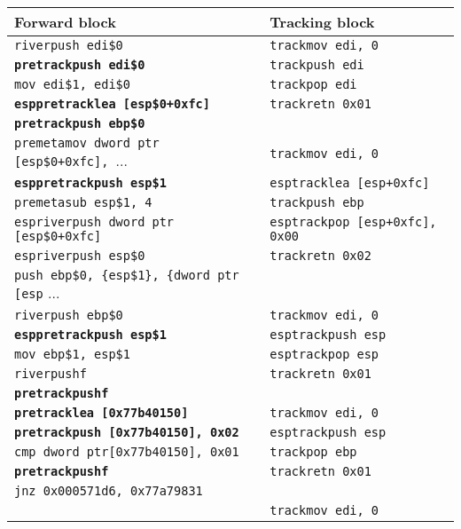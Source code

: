 \documentclass[12pt]{report}
\begin{document}
\begin{table}[H]
	\begin{tabular}{| p{9.7cm} | l |}
		\hline
		\textbf{Forward block}									& \textbf{Tracking block}\\ \hline
		\texttt{riverpush edi\$0}							    & \texttt{trackmov edi, 0}\\
		\texttt{\textbf{pretrackpush edi\$0}}				    & \texttt{trackpush edi}\\
		\texttt{mov edi\$1, edi\$0}							    & \texttt{trackpop edi}\\
		\texttt{\textbf{esppretracklea [esp\$0+0xfc]}}		    & \texttt{trackretn 0x01}\\
		\texttt{\textbf{pretrackpush ebp\$0}}				    &\\
		\texttt{premetamov dword ptr [esp\$0+0xfc], }...	    & \texttt{trackmov edi, 0}\\
		\texttt{\textbf{esppretrackpush esp\$1}}			    & \texttt{esptracklea [esp+0xfc]}\\
		\texttt{premetasub esp\$1, 4}						    & \texttt{trackpush ebp}\\
		\texttt{espriverpush dword ptr [esp\$0+0xfc]}		    & \texttt{esptrackpop [esp+0xfc], 0x00}\\
		\texttt{espriverpush esp\$0}							& \texttt{trackretn 0x02}\\
		\texttt{push ebp\$0, \{esp\$1\}, \{dword ptr [esp} ...  &\\
		\texttt{riverpush ebp\$0}							    & \texttt{trackmov edi, 0}\\
		\texttt{\textbf{esppretrackpush esp\$1}}				& \texttt{esptrackpush esp}\\
		\texttt{mov ebp\$1, esp\$1}							    & \texttt{esptrackpop esp}\\
		\texttt{riverpushf}									    & \texttt{trackretn 0x01}\\
		\texttt{\textbf{pretrackpushf}}						    &\\
		\texttt{\textbf{pretracklea [0x77b40150]}}			    & \texttt{trackmov edi, 0}\\
		\texttt{\textbf{pretrackpush [0x77b40150], 0x02}}	    & \texttt{esptrackpush esp}\\
		\texttt{cmp dword ptr[0x77b40150], 0x01}				& \texttt{trackpop ebp}\\
		\texttt{\textbf{pretrackpushf}}						    & \texttt{trackretn 0x01}\\
		\texttt{jnz 0x000571d6, 0x77a79831}					    &\\
															    & \texttt{trackmov edi, 0}\\

\end{tabular}
\end{table}
\end{document}
